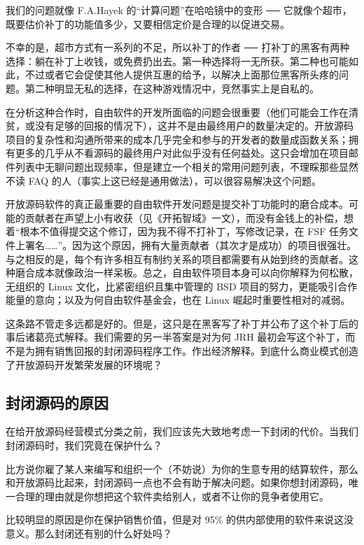 我们的问题就像 F.A.Hayek 的“计算问题”在哈哈镜中的变形 ── 它就像个超市，既要估价补丁的功能值多少，又要相信定价是合理的以促进交易。


不幸的是，超市方式有一系列的不足，所以补丁的作者  ──  打补丁的黑客有两种选择：躺在补丁上收钱，或免费扔出去。第一种选择将一无所获。第二种也可能如此，不过或者它会促使其他人提供互惠的给予，以解决上面那位黑客所头疼的问题。第二种明显无私的选择，在这种游戏情况中，竞然事实上是自私的。


在分析这种合作时，自由软件的开发所面临的问题会很重要（他们可能会工作在清贫，或没有足够的回报的情况下），这并不是由最终用户的数量决定的。开放源码项目的复杂性和沟通所带来的成本几乎完全和参与的开发者的数量成函数关系；拥有更多的几乎从不看源码的最终用户对此似乎没有任何益处。这只会增加在项目邮件列表中无聊问题出现频率，但是建立一个相关的常用问题列表，不理睬那些显然不读 FAQ 的人（事实上这已经是通用做法），可以很容易解决这个问题。


开放源码软件的真正最重要的自由软件开发问题是提交补丁功能时的磨合成本。可能的贡献者在声望上小有收获（见《开拓智域》一文），而没有金钱上的补偿，想着“根本不值得提交这个修订，因为我不得不打补丁，写修改记录，在 FSF 任务文件上署名……”。因为这个原因，拥有大量贡献者（其次才是成功）的项目很强壮。与之相反的是，每个有许多相互有制约关系的项目都需要有从始到终的贡献者。这种磨合成本就像政治一样呆板。总之，自由软件项目本身可以向你解释为何松散，无组织的 Linux 文化，比紧密组织且集中管理的 BSD 项目的努力，更能吸引合作能量的意向；以及为何自由软件基金会，也在 Linux 崛起时重要性相对的减弱。


这条路不管走多远都是好的。但是，这只是在黑客写了补丁并公布了这个补丁后的事后诸葛亮式解释。我们需要的另一半答案是对为何 JRH 最初会写这个补丁，而不是为拥有销售回报的封闭源码程序工作。作出经济解释。到底什么商业模式创造了开放源码开发繁荣发展的环境呢？


\subsection{封闭源码的原因}
在给开放源码经营模式分类之前，我们应该先大致地考虑一下封闭的代价。当我们封闭源码时，我们究竟在保护什么？


比方说你雇了某人来编写和组织一个（不妨说）为你的生意专用的结算软件，那么和开放源码比起来，封闭源码一点也不会有助于解决问题。如果你想封闭源码，唯一合理的理由就是你想把这个软件卖给别人，或者不让你的竞争者使用它。


比较明显的原因是你在保护销售价值，但是对 95\% 的供内部使用的软件来说这没意义。那么封闭还有别的什么好处吗？


